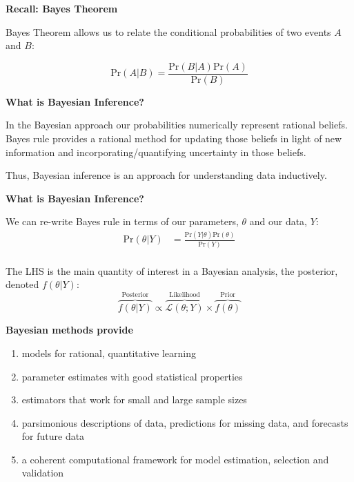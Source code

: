 \documentclass[12pt,xcolor=svgnames]{beamer}
\newcommand{\bl}{\color{blue}}
\newcommand{\theme}{\color{FireBrick}}
\newcommand{\sk}{\vspace{.4cm}}
\newcommand{\chap}[1]{{\theme \Large \bf #1} \sk}
\newcommand{\pr}{\text{Pr}}
\begin{document}
\begin{frame}
\chap{Recall: Bayes Theorem} 

Bayes Theorem allows us to relate the conditional probabilities of two events $A$ and $B$:

\begin{equation*}
\pr(A|B) = \frac{\pr(B|A)\pr(A)}{\pr(B)}
\end{equation*}

\end{frame}

\begin{frame}
\chap{What is Bayesian Inference?} 

In the Bayesian approach our probabilities numerically represent rational beliefs. Bayes rule provides a rational method for updating those beliefs in light of new information and incorporating/quantifying uncertainty in those beliefs.\\

\sk

Thus, Bayesian inference is an approach for understanding data inductively. 

\end{frame}

\begin{frame}
\chap{What is Bayesian Inference?} 

We can re-write Bayes rule in terms of our parameters, $\theta$ and our data, $Y$:
\begin{align*}
\text{Pr}(\theta|Y) & = \frac{\text{Pr}(Y|\theta)\text{Pr}(\theta)}{\text{Pr}(Y)}\\
\end{align*}

The LHS is the main quantity of interest in a Bayesian analysis, the {\bl posterior},  denoted $f(\theta|Y)$:
\begin{equation*}
\overbrace{f(\theta|Y)}^\text{Posterior} \propto \overbrace{\mathcal{L}(\theta; Y)}^\text{Likelihood} \times \overbrace{f(\theta)}^\text{Prior}
\end{equation*}


\end{frame}


\begin{frame}
\chap{Bayesian methods provide} 

\begin{enumerate}
\item models for rational, quantitative learning
\item parameter estimates with good statistical properties
\item estimators that work for small and large sample sizes
\item parsimonious descriptions of data, predictions for missing data, and forecasts for future data
\item a coherent computational framework for model estimation, selection and validation
\end{enumerate}


\end{frame}
\end{document}
